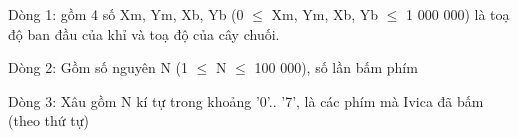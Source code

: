 Dòng 1: gồm 4 số Xm, Ym, Xb, Yb (0 $\le$  Xm, Ym, Xb, Yb $\le$ 1 000 000) là toạ độ ban đầu của khỉ và toạ độ của cây chuối.  

   Dòng 2: Gồm số nguyên N (1 $\le$ N $\le$ 100 000), số lần bấm phím  

   Dòng 3: Xâu gồm N kí tự trong khoảng '0'.. '7', là các phím mà Ivica đã bấm (theo thứ tự)
